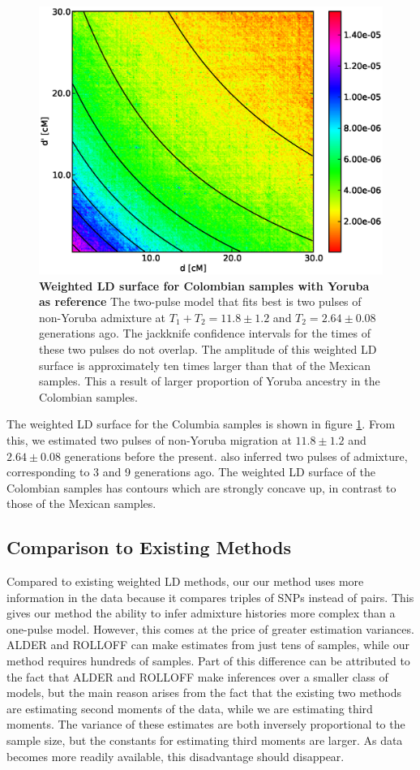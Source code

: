\begin{figure}
\includegraphics[scale=.6]{CLM.eps}
\caption{
{\bf Weighted LD surface for Colombian samples with Yoruba as reference} The two-pulse model that fits best is two pulses of non-Yoruba admixture at $T_1+T_2=11.8\pm 1.2$ and $T_2=2.64 \pm 0.08$ generations ago. The jackknife confidence intervals for the times of these two pulses do not overlap. The amplitude of this weighted LD surface is approximately ten times larger than that of the Mexican samples. This a result of larger proportion of Yoruba ancestry in the Colombian samples.
}
\label{ASH_CLM}
\end{figure}

The weighted LD surface for the Columbia samples is shown in figure \ref{ASH_CLM}. From this, we estimated two pulses of non-Yoruba migration at $11.8\pm 1.2$ and $2.64\pm0.08$ generations before the present. \cite{gravel2013reconstructing} also inferred two pulses of admixture, corresponding to 3 and 9 generations ago. The weighted LD surface of the Colombian samples has contours which are strongly concave up, in contrast to those of the Mexican samples.
\subsection{Comparison to Existing Methods}
Compared to existing weighted LD methods, our our method uses more information in the data because it compares triples of SNPs instead of pairs. This gives our method the ability to infer admixture histories more complex than a one-pulse model. However, this comes at the price of greater estimation variances. ALDER and ROLLOFF can make estimates from just tens of samples, while our method requires hundreds of samples. Part of this difference can be attributed to the fact that ALDER and ROLLOFF make inferences over a smaller class of models, but the main reason arises from the fact that the existing two methods are estimating second moments of the data, while we are estimating third moments. The variance of these estimates are both inversely proportional to the sample size, but the constants for estimating third moments are larger. As data becomes more readily available, this disadvantage should disappear.


